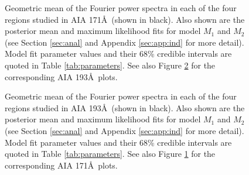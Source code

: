 \documentclass[preprint2]{aastex}
\begin{document}
\begin{figure}
\caption{Geometric mean of the Fourier power spectra in each of the
  four regions studied in AIA 171\AA\ (shown in black).  Also shown
  are the posterior mean and maximum likelihood fits for model $M_{1}$
  and $M_{2}$ (see Section \ref{sec:anal} and Appendix
  \ref{sec:app:ind} for more detail).  Model fit parameter values and
  their 68\% credible intervals are quoted in Table
  \ref{tab:parameters}. See also Figure \ref{fig:fit193} for the
  corresponding AIA 193\AA\ plots.}
\label{fig:fit171}
\end{figure}

\begin{figure}
\caption{Geometric mean of the Fourier power spectra in each of the
  four regions studied in AIA 193\AA\ (shown in black).  Also shown
  are the posterior mean and maximum likelihood fits for model $M_{1}$
  and $M_{2}$ (see Section \ref{sec:anal} and Appendix
  \ref{sec:app:ind} for more detail).  Model fit parameter values and
  their 68\% credible intervals are quoted in Table
  \ref{tab:parameters}. See also Figure \ref{fig:fit171} for the
  corresponding AIA 171\AA\ plots.}
\label{fig:fit193}
\end{figure}
\end{document}
